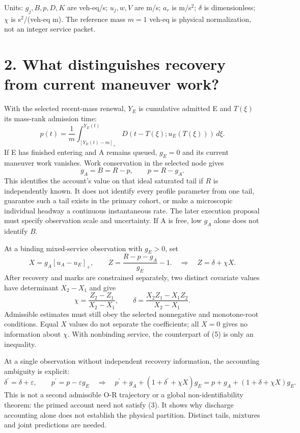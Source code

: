 \documentclass[11pt,a4paper]{article}
\newcommand{\pos}[1]{[#1]_+}
\begin{document}
Units: $g_j,B,p,D,K$ are veh-eq/s; $u_j,w,V$ are m/s; $a_r$ is m/s$^2$;
$\delta$ is dimensionless; $\chi$ is s$^2$/(veh-eq m). The reference
mass $m=1$ veh-eq is physical normalization, not an integer service packet.

\newpage
\section*{2. What distinguishes recovery from current maneuver work?}
With the selected recent-mass renewal, $Y_E$ is cumulative admitted E and
$T(\xi)$ its mass-rank admission time:
\begin{equation}
 p(t)=\frac1m\int_{[Y_E(t)-m]_+}^{Y_E(t)}
 D(t-T(\xi);u_E(T(\xi)))\,d\xi. \tag{3}
\end{equation}
If E has finished entering and A remains queued, $g_E=0$ and its current
maneuver work vanishes. Work conservation in the selected node gives
\begin{equation}
 g_A=B=R-p,\qquad p=R-g_A. \tag{4}
\end{equation}
This identifies the account's value on that ideal saturated tail if $R$ is
independently known. It does not identify every profile parameter from one
tail, guarantee such a tail exists in the primary cohort, or make a
microscopic individual headway a continuous instantaneous rate. The later
execution proposal must specify observation scale and uncertainty.
If A is free, low $g_A$ alone does not identify $B$.

At a binding mixed-service observation with $g_E>0$, set
\begin{equation}
 X=g_A\pos{u_A-u_E},\qquad
 Z=\frac{R-p-g_A}{g_E}-1.
 \quad\Longrightarrow\quad Z=\delta+\chi X. \tag{5}
\end{equation}
After recovery and marks are constrained separately, two distinct covariate
values have determinant $X_2-X_1$ and give
\begin{equation}
 \chi=\frac{Z_2-Z_1}{X_2-X_1},\qquad
 \delta=\frac{X_2Z_1-X_1Z_2}{X_2-X_1}. \tag{6}
\end{equation}
Admissible estimates must still obey the selected nonnegative and
monotone-root conditions. Equal $X$ values do not separate the coefficients;
all $X=0$ gives no information about $\chi$. With nonbinding service,
the counterpart of (5) is only an inequality.

At a single observation without independent recovery information, the
accounting ambiguity is explicit:
\begin{equation}
 \delta^\prime=\delta+\varepsilon,\qquad
 p^\prime=p-\varepsilon g_E
 \quad\Longrightarrow\quad
 p^\prime+g_A+(1+\delta^\prime+\chi X)g_E
 =p+g_A+(1+\delta+\chi X)g_E. \tag{7}
\end{equation}
This is not a second admissible O-R trajectory or a global
non-identifiability theorem: the primed account need not satisfy (3).
It shows why discharge accounting alone does not establish the physical
partition. Distinct tails, mixtures and joint predictions are needed.
\end{document}
